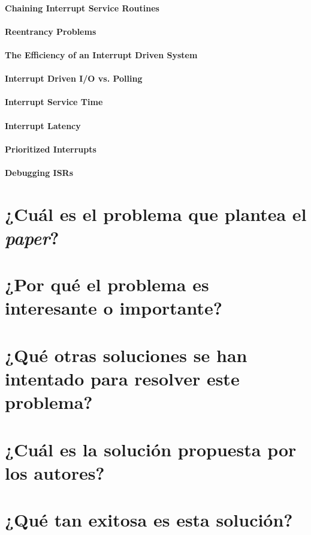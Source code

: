 \paragraph{\textnormal{\textbf{Chaining Interrupt Service Routines}}}

\paragraph{\textnormal{\textbf{Reentrancy Problems}}}

\paragraph{\textnormal{\textbf{The Efficiency of an Interrupt Driven System}}}

\paragraph{Interrupt Driven I/O vs. Polling}

\paragraph{Interrupt Service Time}

\paragraph{Interrupt Latency}

\paragraph{Prioritized Interrupts}

\paragraph{Debugging ISRs}

\section{¿Cuál es el problema que plantea el \textit{paper}?}

\section{¿Por qué el problema es interesante o importante?}

\section{¿Qué otras soluciones se han intentado para resolver este problema?}     

\section{¿Cuál es la solución propuesta por los autores?}

\section{¿Qué tan exitosa es esta solución?}
